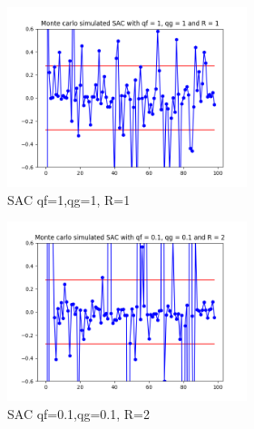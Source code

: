 \documentclass{article}
\begin{document}
\begin{figure}[H]
\begin{subfigure}{1\textwidth}
\begin{subfigure}{.3\textwidth}
                    \includegraphics[width=1\linewidth]{./img/mc/sac.png}
                    \caption{SAC qf=1,qg=1, R=1}
                \end{subfigure}
                \begin{subfigure}{.3\textwidth}  
                    \includegraphics[width=1\linewidth]{./img/mc/sac01r2.png}
                    \caption{SAC qf=0.1,qg=0.1, R=2 }
                \end{subfigure}
                \begin{subfigure}{.3\textwidth}  

\end{subfigure}
\end{subfigure}
\end{figure}
\end{document}
